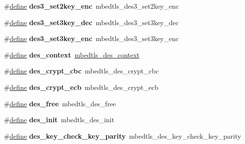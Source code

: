 \begin{DoxyCompactItemize}
\mbox{\label{compat-1_83_8h_ae1ad32c86d9e279451aa15ee53998a86}} 
\#\hyperlink{structdefine}{define} {\bfseries des3\+\_\+set2key\+\_\+enc}~mbedtls\+\_\+des3\+\_\+set2key\+\_\+enc
\item 
\mbox{\label{compat-1_83_8h_abc6dbd679e0065bfd0be94202a69e0d8}} 
\#\hyperlink{structdefine}{define} {\bfseries des3\+\_\+set3key\+\_\+dec}~mbedtls\+\_\+des3\+\_\+set3key\+\_\+dec
\item 
\mbox{\label{compat-1_83_8h_ad61273f112db564d20a03c01d2c0f74a}} 
\#\hyperlink{structdefine}{define} {\bfseries des3\+\_\+set3key\+\_\+enc}~mbedtls\+\_\+des3\+\_\+set3key\+\_\+enc
\item 
\mbox{\label{compat-1_83_8h_a477863689966e5166e3c3c80fb4aa198}} 
\#\hyperlink{structdefine}{define} {\bfseries des\+\_\+context}~\hyperlink{structmbedtls__des__context}{mbedtls\+\_\+des\+\_\+context}
\item 
\mbox{\label{compat-1_83_8h_acba03e7b81d5a0653f69daa1a5a298a7}} 
\#\hyperlink{structdefine}{define} {\bfseries des\+\_\+crypt\+\_\+cbc}~mbedtls\+\_\+des\+\_\+crypt\+\_\+cbc
\item 
\mbox{\label{compat-1_83_8h_aa9f2681f501773dfac6fb3a11cf982e3}} 
\#\hyperlink{structdefine}{define} {\bfseries des\+\_\+crypt\+\_\+ecb}~mbedtls\+\_\+des\+\_\+crypt\+\_\+ecb
\item 
\mbox{\label{compat-1_83_8h_a32844958d49abfd013985b6ad983db0c}} 
\#\hyperlink{structdefine}{define} {\bfseries des\+\_\+free}~mbedtls\+\_\+des\+\_\+free
\item 
\mbox{\label{compat-1_83_8h_a653d9b4473aadb78ef176d49dc117d4d}} 
\#\hyperlink{structdefine}{define} {\bfseries des\+\_\+init}~mbedtls\+\_\+des\+\_\+init
\item 
\mbox{\label{compat-1_83_8h_a1022f937854f6989a1b36362bc21317b}} 
\#\hyperlink{structdefine}{define} {\bfseries des\+\_\+key\+\_\+check\+\_\+key\+\_\+parity}~mbedtls\+\_\+des\+\_\+key\+\_\+check\+\_\+key\+\_\+parity
\item 
\mbox{\label{compat-1_83_8h_ad8ac7b8b7c9ea3d821f95fb646d3d870}} 

\end{DoxyCompactItemize}
